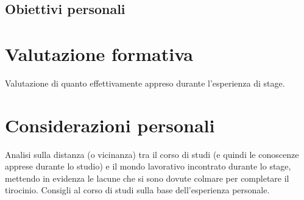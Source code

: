 \subsection{Obiettivi personali}

\section{Valutazione formativa}
Valutazione di quanto effettivamente appreso durante l'esperienza di stage.

\section{Considerazioni personali}
Analisi sulla distanza (o vicinanza) tra il corso di studi (e quindi le conoscenze apprese durante lo studio) e il mondo lavorativo incontrato durante lo stage, mettendo in evidenza le lacune che si sono dovute colmare per completare il tirocinio.
Consigli al corso di studi sulla base dell'esperienza personale.